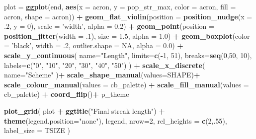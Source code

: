 \documentclass[]{book}
\newenvironment{Shaded}{\begin{snugshade}}{\end{snugshade}}
\newcommand{\DataTypeTok}[1]{\textcolor[rgb]{0.13,0.29,0.53}{#1}}
\newcommand{\DecValTok}[1]{\textcolor[rgb]{0.00,0.00,0.81}{#1}}
\newcommand{\FloatTok}[1]{\textcolor[rgb]{0.00,0.00,0.81}{#1}}
\newcommand{\KeywordTok}[1]{\textcolor[rgb]{0.13,0.29,0.53}{\textbf{#1}}}
\newcommand{\NormalTok}[1]{#1}
\newcommand{\OperatorTok}[1]{\textcolor[rgb]{0.81,0.36,0.00}{\textbf{#1}}}
\newcommand{\OtherTok}[1]{\textcolor[rgb]{0.56,0.35,0.01}{#1}}
\newcommand{\StringTok}[1]{\textcolor[rgb]{0.31,0.60,0.02}{#1}}
\begin{document}
\begin{Shaded}
\begin{Highlighting}[]
\NormalTok{plot =}\StringTok{ }\KeywordTok{ggplot}\NormalTok{(end, }\KeywordTok{aes}\NormalTok{(}\DataTypeTok{x =}\NormalTok{ acron, }\DataTypeTok{y =}\NormalTok{ pop_str_max, }\DataTypeTok{color =}\NormalTok{ acron, }\DataTypeTok{fill =}\NormalTok{ acron, }\DataTypeTok{shape =}\NormalTok{ acron)) }\OperatorTok{+}
\StringTok{  }\KeywordTok{geom_flat_violin}\NormalTok{(}\DataTypeTok{position =} \KeywordTok{position_nudge}\NormalTok{(}\DataTypeTok{x =} \FloatTok{.2}\NormalTok{, }\DataTypeTok{y =} \DecValTok{0}\NormalTok{), }\DataTypeTok{scale =} \StringTok{'width'}\NormalTok{, }\DataTypeTok{alpha =} \FloatTok{0.2}\NormalTok{) }\OperatorTok{+}
\StringTok{  }\KeywordTok{geom_point}\NormalTok{(}\DataTypeTok{position =} \KeywordTok{position_jitter}\NormalTok{(}\DataTypeTok{width =} \FloatTok{.1}\NormalTok{), }\DataTypeTok{size =} \FloatTok{1.5}\NormalTok{, }\DataTypeTok{alpha =} \FloatTok{1.0}\NormalTok{) }\OperatorTok{+}
\StringTok{  }\KeywordTok{geom_boxplot}\NormalTok{(}\DataTypeTok{color =} \StringTok{'black'}\NormalTok{, }\DataTypeTok{width =} \FloatTok{.2}\NormalTok{, }\DataTypeTok{outlier.shape =} \OtherTok{NA}\NormalTok{, }\DataTypeTok{alpha =} \FloatTok{0.0}\NormalTok{) }\OperatorTok{+}
\StringTok{  }\KeywordTok{scale_y_continuous}\NormalTok{(}
    \DataTypeTok{name=}\StringTok{"Length"}\NormalTok{,}
    \DataTypeTok{limits=}\KeywordTok{c}\NormalTok{(}\OperatorTok{-}\DecValTok{1}\NormalTok{, }\DecValTok{51}\NormalTok{),}
    \DataTypeTok{breaks=}\KeywordTok{seq}\NormalTok{(}\DecValTok{0}\NormalTok{,}\DecValTok{50}\NormalTok{, }\DecValTok{10}\NormalTok{),}
    \DataTypeTok{labels=}\KeywordTok{c}\NormalTok{(}\StringTok{"0"}\NormalTok{, }\StringTok{"10"}\NormalTok{, }\StringTok{"20"}\NormalTok{, }\StringTok{"30"}\NormalTok{, }\StringTok{"40"}\NormalTok{, }\StringTok{"50"}\NormalTok{)}
\NormalTok{  ) }\OperatorTok{+}
\StringTok{  }\KeywordTok{scale_x_discrete}\NormalTok{(}
    \DataTypeTok{name=}\StringTok{"Scheme"}
\NormalTok{  )}\OperatorTok{+}
\StringTok{  }\KeywordTok{scale_shape_manual}\NormalTok{(}\DataTypeTok{values=}\NormalTok{SHAPE)}\OperatorTok{+}
\StringTok{  }\KeywordTok{scale_colour_manual}\NormalTok{(}\DataTypeTok{values =}\NormalTok{ cb_palette) }\OperatorTok{+}
\StringTok{  }\KeywordTok{scale_fill_manual}\NormalTok{(}\DataTypeTok{values =}\NormalTok{ cb_palette) }\OperatorTok{+}
\StringTok{  }\KeywordTok{coord_flip}\NormalTok{()}\OperatorTok{+}
\StringTok{  }\NormalTok{p_theme}

\KeywordTok{plot_grid}\NormalTok{(}
\NormalTok{  plot }\OperatorTok{+}
\StringTok{    }\KeywordTok{ggtitle}\NormalTok{(}\StringTok{"Final streak length"}\NormalTok{) }\OperatorTok{+}
\StringTok{    }\KeywordTok{theme}\NormalTok{(}\DataTypeTok{legend.position=}\StringTok{"none"}\NormalTok{),}
\NormalTok{  legend,}
  \DataTypeTok{nrow=}\DecValTok{2}\NormalTok{,}
  \DataTypeTok{rel_heights =} \KeywordTok{c}\NormalTok{(}\DecValTok{2}\NormalTok{,.}\DecValTok{55}\NormalTok{),}
  \DataTypeTok{label_size =}\NormalTok{ TSIZE}
\NormalTok{)}
\end{Highlighting}
\end{Shaded}
\end{document}

